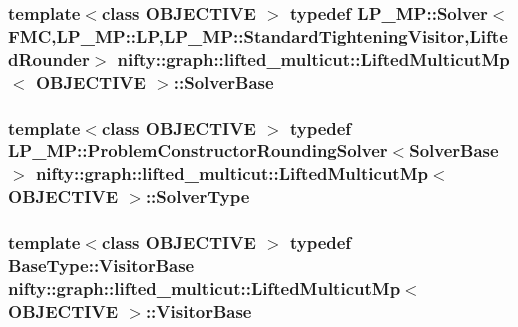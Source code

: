 \subsubsection[{Solver\+Base}]{\setlength{\rightskip}{0pt plus 5cm}template$<$class O\+B\+J\+E\+C\+T\+I\+V\+E $>$ typedef L\+P\+\_\+\+M\+P\+::\+Solver$<${\bf F\+M\+C},L\+P\+\_\+\+M\+P\+::\+L\+P,L\+P\+\_\+\+M\+P\+::\+Standard\+Tightening\+Visitor,{\bf Lifted\+Rounder}$>$ {\bf nifty\+::graph\+::lifted\+\_\+multicut\+::\+Lifted\+Multicut\+Mp}$<$ O\+B\+J\+E\+C\+T\+I\+V\+E $>$\+::{\bf Solver\+Base}}\label{classnifty_1_1graph_1_1lifted__multicut_1_1LiftedMulticutMp_af9810af21796143a4ae499e061e5f80c}
\hypertarget{classnifty_1_1graph_1_1lifted__multicut_1_1LiftedMulticutMp_a74937c2d33c809a39472710855ae7d8a}{}
\subsubsection[{Solver\+Type}]{\setlength{\rightskip}{0pt plus 5cm}template$<$class O\+B\+J\+E\+C\+T\+I\+V\+E $>$ typedef L\+P\+\_\+\+M\+P\+::\+Problem\+Constructor\+Rounding\+Solver$<${\bf Solver\+Base}$>$ {\bf nifty\+::graph\+::lifted\+\_\+multicut\+::\+Lifted\+Multicut\+Mp}$<$ O\+B\+J\+E\+C\+T\+I\+V\+E $>$\+::{\bf Solver\+Type}}\label{classnifty_1_1graph_1_1lifted__multicut_1_1LiftedMulticutMp_a74937c2d33c809a39472710855ae7d8a}
\hypertarget{classnifty_1_1graph_1_1lifted__multicut_1_1LiftedMulticutMp_aa05a3ad0bdbbfa76ffc49f3bda58d578}{}
\subsubsection[{Visitor\+Base}]{\setlength{\rightskip}{0pt plus 5cm}template$<$class O\+B\+J\+E\+C\+T\+I\+V\+E $>$ typedef Base\+Type\+::\+Visitor\+Base {\bf nifty\+::graph\+::lifted\+\_\+multicut\+::\+Lifted\+Multicut\+Mp}$<$ O\+B\+J\+E\+C\+T\+I\+V\+E $>$\+::{\bf Visitor\+Base}}\label{classnifty_1_1graph_1_1lifted__multicut_1_1LiftedMulticutMp_aa05a3ad0bdbbfa76ffc49f3bda58d578}
\hypertarget{classnifty_1_1graph_1_1lifted__multicut_1_1LiftedMulticutMp_ae6776ff7ee9f8c9767d13d8d5f6435bb}{}
